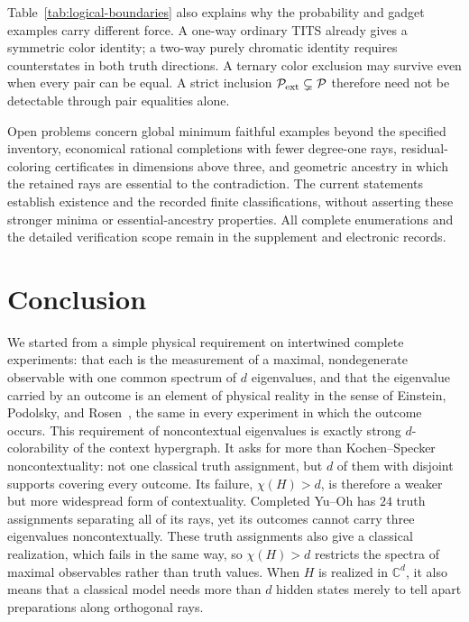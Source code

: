 \documentclass[aps,pra,reprint,superscriptaddress,longbibliography,nofootinbib,floatfix,10pt]{revtex4-2}
\theoremstyle{definition}\newtheorem{definition}[theorem]{Definition}
\theoremstyle{remark}\newtheorem{remark}[theorem]{Remark}
\newcommand{\C}{\mathbb C}\newcommand{\R}{\mathbb R}\newcommand{\Q}{\mathbb Q}
\begin{document}
Table~\ref{tab:logical-boundaries} also explains why the probability and gadget examples carry different force. A one-way ordinary TITS already gives a symmetric color identity; a two-way purely chromatic identity requires counterstates in both truth directions. A ternary color exclusion may survive even when every pair can be equal. A strict inclusion $\mathcal P_{\rm ext}\subsetneq\mathcal P$ therefore need not be detectable through pair equalities alone.

Open problems concern global minimum faithful examples beyond the specified inventory, economical rational completions with fewer degree-one rays, residual-coloring certificates in dimensions above three, and geometric ancestry in which the retained rays are essential to the contradiction. The current statements establish existence and the recorded finite classifications, without asserting these stronger minima or essential-ancestry properties. All complete enumerations and the detailed verification scope remain in the supplement and electronic records.

\section{Conclusion}\label{sec:conclusion}

We started from a simple physical requirement on intertwined complete experiments: that each is the measurement of a maximal, nondegenerate observable with one common spectrum of $d$ eigenvalues, and that the eigenvalue carried by an outcome is an element of physical reality in the sense of Einstein, Podolsky, and Rosen~\cite{epr}, the same in every experiment in which the outcome occurs. This requirement of noncontextual eigenvalues is exactly strong $d$-colorability of the context hypergraph. It asks for more than Kochen--Specker noncontextuality: not one classical truth assignment, but $d$ of them with disjoint supports covering every outcome. Its failure, $\chi(H)>d$, is therefore a weaker but more widespread form of contextuality. Completed Yu--Oh has $24$ truth assignments separating all of its rays, yet its outcomes cannot carry three eigenvalues noncontextually. These truth assignments also give a classical realization, which fails in the same way, so $\chi(H)>d$ restricts the spectra of maximal observables rather than truth values. When $H$ is realized in $\C^d$, it also means that a classical model needs more than $d$ hidden states merely to tell apart preparations along orthogonal rays.
\end{document}
